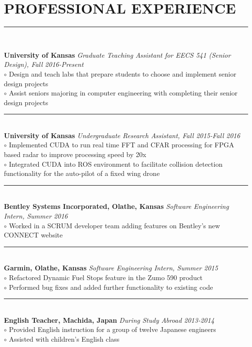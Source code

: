 \documentclass[twoside]{article}
\begin{document}
\section*{PROFESSIONAL EXPERIENCE}
\vspace{-1em}
\rule{\textwidth}{1pt}\\
\begin{adjustwidth}{0.2in}{0in}
\vspace{-1em}
\textbf{University of Kansas} \hfill \textit{Graduate Teaching Assistant for EECS 541 (Senior Design), Fall 2016-Present}\\
$\circ$ Design and teach labs that prepare students to choose and implement senior design projects\\
$\circ$ Assist seniors majoring in computer engineering with completing their senior design projects\\
\rule{7.3in}{0.5pt}\\
\textbf{University of Kansas} \hfill \textit{Undergraduate Research Assistant, Fall 2015-Fall 2016}\\
$\circ$ Implemented CUDA to run real time FFT and CFAR processing for FPGA based radar to improve processing speed by 20x\\
$\circ$ Integrated CUDA into ROS environment to facilitate collision detection functionality for the auto-pilot of a fixed wing drone\\
\rule{7.3in}{0.5pt}\\
\textbf{Bentley Systems Incorporated, Olathe, Kansas} \hfill \textit{Software Engineering Intern, Summer 2016}\\
$\circ$ Worked in a SCRUM developer team adding features on Bentley's new CONNECT website\\
\rule{7.3in}{0.5pt}\\
\textbf{Garmin, Olathe, Kansas} \hfill \textit{Software Engineering Intern, Summer 2015}\\
$\circ$ Refactored Dynamic Fuel Stops feature in the Zumo 590 product\\
$\circ$ Performed bug fixes and added further functionality to existing code\\
\rule{7.3in}{0.5pt}\\
\textbf{English Teacher, Machida, Japan} \hfill \textit{During Study Abroad 2013-2014}\\
$\circ$ Provided English instruction for a group of twelve Japanese engineers\\
$\circ$ Assisted with children's English class\\

\end{adjustwidth}
\end{document}
